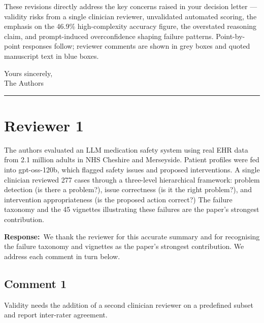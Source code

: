 \documentclass[11pt,a4paper]{article}
\newcounter{rcomment}
\newcommand{\response}{\noindent\textbf{Response:}\ }
\begin{document}
These revisions directly address the key concerns raised in your decision letter --- validity risks from a single clinician reviewer, unvalidated automated scoring, the emphasis on the 46.9\% high-complexity accuracy figure, the overstated reasoning claim, and prompt-induced overconfidence shaping failure patterns. Point-by-point responses follow; reviewer comments are shown in grey boxes and quoted manuscript text in blue boxes.

\vspace{0.5em}
Yours sincerely,\\
The Authors

\vspace{1em}
\hrule

\section*{Reviewer 1}

\begin{reviewercomment}
The authors evaluated an LLM medication safety system using real EHR data from 2.1 million adults in NHS Cheshire and Merseyside. Patient profiles were fed into gpt-oss-120b, which flagged safety issues and proposed interventions. A single clinician reviewed 277 cases through a three-level hierarchical framework: problem detection (is there a problem?), issue correctness (is it the right problem?), and intervention appropriateness (is the proposed action correct?) The failure taxonomy and the 45 vignettes illustrating these failures are the paper's strongest contribution.
\end{reviewercomment}

\response We thank the reviewer for this accurate summary and for recognising the failure taxonomy and vignettes as the paper's strongest contribution. We address each comment in turn below.

\subsection*{Comment 1}
\begin{reviewercomment}
Validity needs the addition of a second clinician reviewer on a predefined subset and report inter-rater agreement.
\end{reviewercomment}
\end{document}
